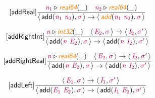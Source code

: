 \documentclass[10pt,leqno,fleqn]{article}
\newcommand{\artVariable}[1]{\mbox{\color{purple}\em #1\/}}
\newcommand{\artConstructor}[1]{\mbox{\sf #1}}
\newcommand{\artSpecial}[1]{\mbox{\color{orange}\sf\em #1}}
\begin{document}
\begin{equation}
\tag*{[\artConstructor{\sf addReal}]}
\begin{split}\frac{ \artVariable{n$_{1}$}\triangleright \artSpecial{real64}(\_) \quad  \artVariable{n$_{2}$}\triangleright \artSpecial{real64}(\_) }{\langle\, \artConstructor{\sf add}(\artVariable{n$_{1}$}\ \artVariable{n$_{2}$}), \artVariable{$\sigma$}\,\rangle \rightarrow \langle\, \artSpecial{add}(\artVariable{n$_{1}$}\ \artVariable{n$_{2}$}), \artVariable{$\sigma$}\,\rangle }
\end{split}
\end{equation}

\begin{equation}
\tag*{[\artConstructor{\sf addRightInt}]}
\begin{split}\frac{ \artVariable{n}\triangleright \artSpecial{int32}(\_) \quad \langle\, \artVariable{E$_{2}$}, \artVariable{$\sigma$}\,\rangle \rightarrow \langle\, \artVariable{I$_{2}$}, \artVariable{$\sigma$\/$^\prime$}\,\rangle }{\langle\, \artConstructor{\sf add}(\artVariable{n}\ \artVariable{E$_{2}$}), \artVariable{$\sigma$}\,\rangle \rightarrow \langle\, \artConstructor{\sf add}(\artVariable{n}\ \artVariable{I$_{2}$}), \artVariable{$\sigma$\/$^\prime$}\,\rangle }
\end{split}
\end{equation}

\begin{equation}
\tag*{[\artConstructor{\sf addRightReal}]}
\begin{split}\frac{ \artVariable{n}\triangleright \artSpecial{real64}(\_) \quad \langle\, \artVariable{E$_{2}$}, \artVariable{$\sigma$}\,\rangle \rightarrow \langle\, \artVariable{I$_{2}$}, \artVariable{$\sigma$\/$^\prime$}\,\rangle }{\langle\, \artConstructor{\sf add}(\artVariable{n}\ \artVariable{E$_{2}$}), \artVariable{$\sigma$}\,\rangle \rightarrow \langle\, \artConstructor{\sf add}(\artVariable{n}\ \artVariable{I$_{2}$}), \artVariable{$\sigma$\/$^\prime$}\,\rangle }
\end{split}
\end{equation}

\begin{equation}
\tag*{[\artConstructor{\sf addLeft}]}
\begin{split}\frac{\langle\, \artVariable{E$_{1}$}, \artVariable{$\sigma$}\,\rangle \rightarrow \langle\, \artVariable{I$_{1}$}, \artVariable{$\sigma$\/$^\prime$}\,\rangle }{\langle\, \artConstructor{\sf add}(\artVariable{E$_{1}$}\ \artVariable{E$_{2}$}), \artVariable{$\sigma$}\,\rangle \rightarrow \langle\, \artConstructor{\sf add}(\artVariable{I$_{1}$}\ \artVariable{E$_{2}$}), \artVariable{$\sigma$\/$^\prime$}\,\rangle }
\end{split}
\end{equation}
\end{document}
